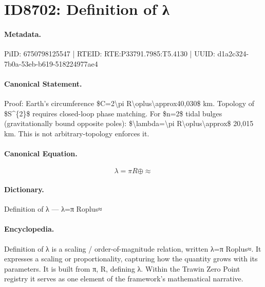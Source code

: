 \section*{ID8702: Definition of λ}
\paragraph{Metadata.}
PiID: 6750798125547 | RTEID: RTE:P33791.7985:T5.4130 | UUID: d1a2c324-7b0a-53eb-b619-518224977ae4

\paragraph{Canonical Statement.}
Proof: Earth's circumference \$C=2\textbackslash{}pi R\textbackslash{}oplus\textbackslash{}approx40,030\$ km. Topology of \$S\textasciicircum{}\{2\}\$ requires closed-loop phase matching. For \$n=2\$ tidal bulges (gravitationally bound opposite poles): \$\textbackslash{}lambda=\textbackslash{}pi R\textbackslash{}oplus\textbackslash{}approx\$ 20,015 km. This is not arbitrary-topology enforces it.

\paragraph{Canonical Equation.}
\[
\lambda=\pi R\oplus\approx
\]

\paragraph{Dictionary.}
Definition of λ — λ=π Roplus≈

\paragraph{Encyclopedia.}
Definition of λ is a scaling / order-of-magnitude relation, written λ=π Roplus≈. It expresses a scaling or proportionality, capturing how the quantity grows with its parameters. It is built from π, R, defining λ. Within the Trawin Zero Point registry it serves as one element of the framework's mathematical narrative.
